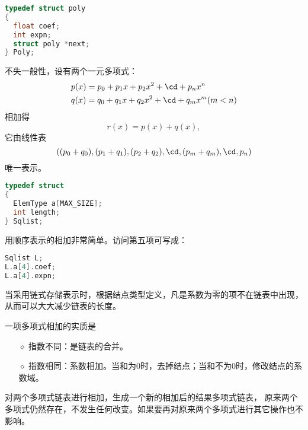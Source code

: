 \begin{frame}[fragile]
\begin{dingyi}[链式存储表示的类型]
\begin{lstlisting}[language=C,basicstyle=\ttfamily\small]
typedef struct poly
{
  float coef;
  int expn;
  struct poly *next;
} Poly;
\end{lstlisting}
\end{dingyi}
\end{frame}
%
\begin{frame}[fragile]
不失一般性，设有两个一元多项式：
$$
\begin{aligned}
&p(x)=p_0+p_1x+p_2x^2+\cd+p_nx^n\\
&q(x)=q_0+q_1x+q_2x^2+\cd+q_mx^m(m<n)
\end{aligned}
$$
相加得
$$
r(x)=p(x)+q(x),
$$
它由线性表
$$
((p_0+q_0),(p_1+q_1),(p_2+q_2),\cd,(p_m+q_m),\cd,p_n)
$$
唯一表示。
\end{frame}
%
\begin{frame}[fragile]

\begin{dingyi}[顺序表的定义]
\begin{lstlisting}[language=C,frame=none]
typedef struct 
{
  ElemType a[MAX_SIZE];
  int length;
} Sqlist;
\end{lstlisting}
\end{dingyi}
用顺序表示的相加非常简单。访问第五项可写成：
\begin{lstlisting}[language=C,basicstyle=\ttfamily\small]
Sqlist L;
L.a[4].coef;
L.a[4].expn;
\end{lstlisting}
\end{frame}
%
\begin{frame}[fragile]

当采用链式存储表示时，根据结点类型定义，凡是系数为零的项不在链表中出现，从而可以大大减少链表的长度。 
 
一项多项式相加的实质是
\begin{itemize}
\item[$\diamond$]
指数不同：是链表的合并。
\item[$\diamond$]
指数相同：系数相加。当和为0时，去掉结点；当和不为0时，修改结点的系数域。
\end{itemize}
\end{frame}
%

%
\begin{frame}[fragile]
对两个多项式链表进行相加，生成一个新的相加后的结果多项式链表，
原来两个多项式仍然存在，不发生任何改变。如果要再对原来两个多项式进行其它操作也不影响。
\end{frame}

